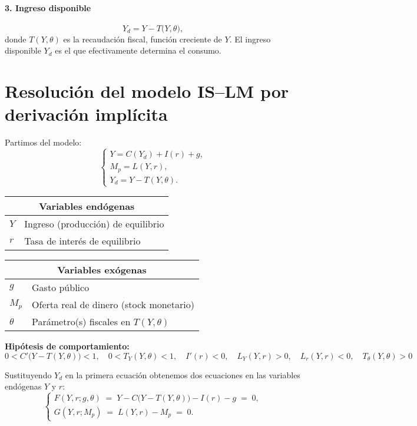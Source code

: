 \documentclass{article}
\begin{document}
\bigskip

\paragraph{3. Ingreso disponible}  
\[
Y_d = Y - T\bigl(Y,\theta\bigr),
\]
donde \(T(Y,\theta)\) es la recaudación fiscal, función creciente de \(Y\). El ingreso disponible \(Y_d\) es el que efectivamente determina el consumo.

\bigskip



\section*{Resolución del modelo IS–LM por derivación implícita}


Partimos del modelo:
\[
\begin{cases}
Y = C(Y_d) + I(r) + g,\\
M_p = L(Y,r),\\
Y_d = Y - T(Y,\theta).
\end{cases}
\]

\begin{table}[H]
\centering
\begin{tabular}{|l|l|}
\hline
\multicolumn{2}{|c|}{\textbf{\color{teal}Variables endógenas}} \\ \hline
$Y$ & Ingreso (producción) de equilibrio \\ \hline
$r$ & Tasa de interés de equilibrio \\ \hline
\end{tabular}
\quad
\begin{tabular}{|l|l|}
\hline
\multicolumn{2}{|c|}{\textbf{\color{teal}Variables exógenas}} \\ \hline
$g$      & Gasto público \\ \hline
$M_p$    & Oferta real de dinero (stock monetario) \\ \hline
$\theta$ & Parámetro(s) fiscales en $T(Y,\theta)$ \\ \hline
\end{tabular}
\end{table}

\noindent
\textbf{\color{teal}Hipótesis de comportamiento:}
\[
0 < C'\bigl(Y - T(Y,\theta)\bigr) < 1,
\quad
0 < T_Y(Y,\theta) < 1,
\quad
I'(r) < 0,
\quad
L_Y(Y,r) > 0,
\quad
L_r(Y,r) < 0,
\quad
T_\theta(Y,\theta) >0
\]


Sustituyendo \(Y_d\) en la primera ecuación obtenemos dos ecuaciones en las variables endógenas \(Y\) y \(r\):
\[
\begin{cases}
F(Y,r;g,\theta)\;=\;Y - C\bigl(Y - T(Y,\theta)\bigr) - I(r) - g \;=\;0,\\[6pt]
G(Y,r;M_p)\;=\;L(Y,r) - M_p \;=\;0.
\end{cases}
\]
\end{document}
